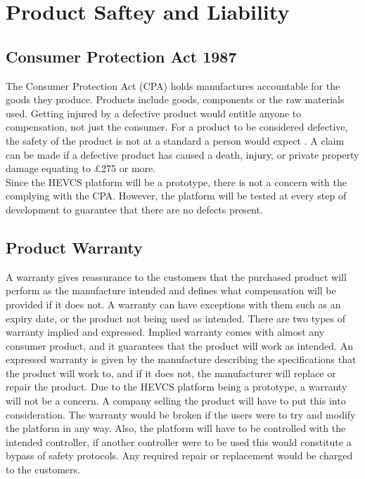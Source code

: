 \documentclass [12pt]{article}
\begin{document}
\section{Product Saftey and Liability}\label{sec:Product_Safety_and_Liability}

\subsection{Consumer Protection Act 1987}\label{sec:Consumer_Protection_Act}

The Consumer Protection Act (CPA) holds manufactures accountable for the goods they produce. Products include goods, components or the raw materials used. Getting injured by a defective product would entitle anyone to compensation, not just the consumer. For a product to be considered defective, the safety of the product is not at a standard a person would expect \cite{Consumer_Protection}. A claim can be made if a defective product has caused a death, injury, or private property damage equating to £275 or more. 
\\
Since the HEVCS platform will be a prototype, there is not a concern with the complying with the CPA. However, the platform will be tested at every step of development to guarantee that there are no defects present. 

\subsection{Product Warranty}\label{sec:Product_Warranty}

A warranty gives reassurance to the customers that the purchased product will perform as the manufacture intended and defines what compensation will be provided if it does not. \cite{Warranty} A warranty can have exceptions with them such as an expiry date, or the product not being used as intended. There are two types of warranty implied and expressed. Implied warranty comes with almost any consumer product, and it guarantees that the product will work as intended. An expressed warranty is given by the manufacture describing the specifications that the product will work to, and if it does not, the manufacturer will replace or repair the product. \cite{Warranty}
Due to the HEVCS platform being a prototype, a warranty will not be a concern. A company selling the product will have to put this into consideration. The warranty would be broken if the users were to try and modify the platform in any way. Also, the platform will have to be controlled with the intended controller, if another controller were to be used this would constitute a bypass of safety protocols. Any required repair or replacement would be charged to the customers.
\end{document}
